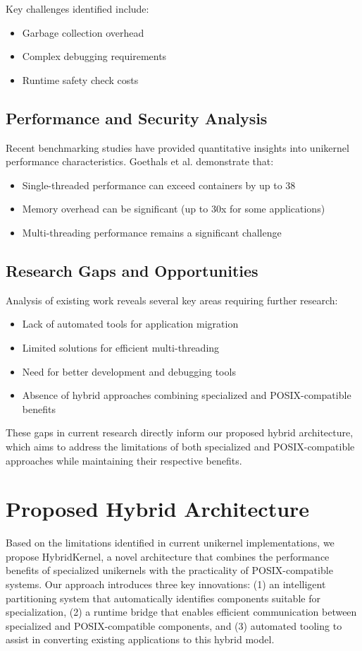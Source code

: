 \documentclass[conference]{IEEEtran}
\begin{document}
Key challenges identified include:
\begin{itemize}
	\item Garbage collection overhead
	\item Complex debugging requirements
	\item Runtime safety check costs
\end{itemize}

\subsection{Performance and Security Analysis}
Recent benchmarking studies have provided quantitative insights into unikernel performance characteristics. Goethals et al. \cite{unikernels_vs_containers} demonstrate that:
\begin{itemize}
	\item Single-threaded performance can exceed containers by up to 38%
	\item Memory overhead can be significant (up to 30x for some applications)
	\item Multi-threading performance remains a significant challenge
\end{itemize}

\subsection{Research Gaps and Opportunities}
Analysis of existing work reveals several key areas requiring further research:
\begin{itemize}
	\item Lack of automated tools for application migration
	\item Limited solutions for efficient multi-threading
	\item Need for better development and debugging tools
	\item Absence of hybrid approaches combining specialized and POSIX-compatible benefits
\end{itemize}

These gaps in current research directly inform our proposed hybrid architecture, which aims to address the limitations of both specialized and POSIX-compatible approaches while maintaining their respective benefits.

\section{Proposed Hybrid Architecture}
Based on the limitations identified in current unikernel implementations, we propose HybridKernel, a novel architecture that combines the performance benefits of specialized unikernels with the practicality of POSIX-compatible systems. Our approach introduces three key innovations: (1) an intelligent partitioning system that automatically identifies components suitable for specialization, (2) a runtime bridge that enables efficient communication between specialized and POSIX-compatible components, and (3) automated tooling to assist in converting existing applications to this hybrid model.
\end{document}
